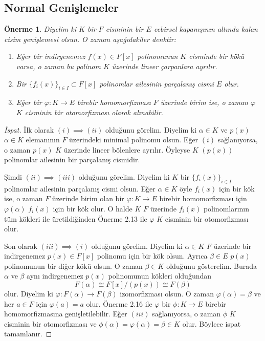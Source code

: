 \documentclass[draft]{article}
\newtheorem{prop}[thm]{Önerme}
\theoremstyle{definition}
\theoremstyle{remark}
\begin{document}
    	\subsection{Normal Genişlemeler}
    	
    	    \begin{prop}
    	        Diyelim ki $K$ bir $F$ cisminin bir $E$ cebirsel kapanışının altında kalan cisim genişlemesi olsun. O zaman aşağıdakiler denktir:
    	        \begin{enumerate}
				\renewcommand{\labelenumi}{(\roman{enumi})}
				    \item Eğer bir indirgenemez $f(x) \in F[x]$ polinomunun $K$ cisminde bir kökü varsa, o zaman bu polinom $K$ üzerinde lineer çarpanlara ayrılır.
				    \item Bir $\{f_i(x)\}_{i \in I} \subset F[x]$ polinomlar ailesinin parçalanış cismi $E$ olur.
				    \item Eğer bir $\varphi : K \to E$ birebir homomorfizması $F$ üzerinde birim ise, o zaman $\varphi$ $K$ cisminin bir otomorfizması olarak alınabilir.
				\end{enumerate}
    	    \end{prop}
    	    
    	    \begin{proof}[İspat]
    	        İlk olarak $(i) \implies (ii)$ olduğunu görelim. Diyelim ki $\alpha \in K$ ve $p(x)$ $\alpha \in K$ elemanının $F$ üzerindeki minimal polinomu olsun. Eğer $(i)$ sağlanıyorsa, o zaman $p(x)$ $K$ üzerinde lineer bölenlere ayrılır. Öyleyse $K$ $(p(x))$ polinomlar ailesinin bir parçalanış cismidir.\par
    	        Şimdi $(ii) \implies (iii)$ olduğunu görelim. Diyelim ki $K$ bir $\{f_i(x)\}_{i \in I}$ polinomlar ailesinin parçalanış cismi olsun. Eğer $\alpha \in K$ öyle $f_i(x)$ için bir kök ise, o zaman $F$ üzerinde birim olan bir $\varphi: K \to E$ birebir homomorfizması için $\varphi(\alpha)$ $f_i(x)$ için bir kök olur. O halde $K$ $F$ üzerinde $f_i(x)$ polinomlarının tüm kökleri ile üretildiğinden Önerme 2.13 ile $\varphi$ $K$ cisminin bir otomorfizması olur.\par
    	        Son olarak $(iii) \implies (i)$ olduğunu görelim. Diyelim ki $\alpha \in K$ $F$ üzerinde bir indirgenemez $p(x) \in F[x]$ polinomu için bir kök olsun. Ayrıca $\beta \in E$ $p(x)$ polinomunun bir diğer kökü olsun. O zaman $\beta \in K$ olduğunu gösterelim. Burada $\alpha$ ve $\beta$ aynı indirgenemez $p(x)$ polinomunun kökleri olduğundan
    	        \begin{equation*}
    	            F(\alpha) \cong F[x]/(p(x)) \cong F(\beta)
    	        \end{equation*}
    	        olur. Diyelim ki $\varphi: F(\alpha) \to F(\beta)$ izomorfizması olsun. O zaman $\varphi(\alpha) = \beta$ ve her $a \in F$ için $\varphi(a) = a$ olur. Önerme 2.16 ile $\varphi$ bir $\phi: K \to E$ birebir homomorfizmasına genişletilebilir. Eğer $(iii)$ sağlanıyorsa, o zaman $\phi$ $K$ cisminin bir otomorfizması ve $\phi(\alpha) = \varphi(\alpha) = \beta \in K$ olur. Böylece ispat tamamlanır.
    	    \end{proof}
    	    
\end{document}
